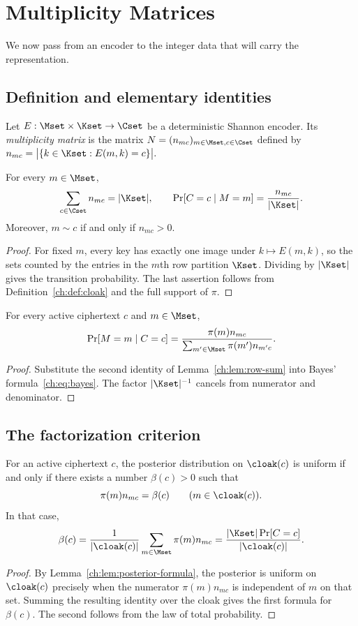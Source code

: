 ﻿\chapter[Multiplicity Matrices]{Multiplicity Matrices}\label{ch:sec:multiplicity}
We now pass from an encoder to the integer data that will carry the representation.
\section{Definition and elementary identities}
\begin{definition}\label{ch:def:multiplicity}
Let $E:\Mset\times\Kset\to\Cset$ be a deterministic Shannon encoder. Its \emph{multiplicity matrix} is the matrix $N=(n_{mc})_{m\in\Mset,c\in\Cset}$ defined by
$n_{mc}=\bigl|\{k\in\Kset:E(m,k)=c\}\bigr|.$
\end{definition}
\begin{lemma}\label{ch:lem:row-sum}
For every $m\in\Mset$,
\[
 \sum_{c\in\Cset}n_{mc}=|\Kset|,
 \qquad
 \Pr[C=c\mid M=m]=\frac{n_{mc}}{|\Kset|}.
\]
Moreover, $m\sim c$ if and only if $n_{mc}>0$.
\end{lemma}
\begin{proof}
For fixed $m$, every key has exactly one image under $k\mapsto E(m,k)$, so the sets counted by the entries in the $m$th row partition $\Kset$. Dividing by $|\Kset|$ gives the transition probability. The last assertion follows from Definition~\ref{ch:def:cloak} and the full support of $\pi$.
\end{proof}

\begin{lemma}\label{ch:lem:posterior-formula}
For every active ciphertext $c$ and $m\in\Mset$,
\[
 \Pr[M=m\mid C=c]
 =\frac{\pi(m)n_{mc}}{\sum_{m'\in\Mset}\pi(m')n_{m'c}}.
\]
\end{lemma}
\begin{proof}
Substitute the second identity of Lemma~\ref{ch:lem:row-sum} into Bayes' formula~\eqref{ch:eq:bayes}. The factor $|\Kset|^{-1}$ cancels from numerator and denominator.
\end{proof}
\section{The factorization criterion}
\begin{proposition}\label{ch:prop:factorization-criterion}
For an active ciphertext $c$, the posterior distribution on $\cloak(c)$ is uniform if and only if there exists a number $\beta(c)>0$ such that
\[
 \pi(m)n_{mc}=\beta(c)
 \qquad(m\in\cloak(c)).
\]
In that case,
\[
 \beta(c)=\frac{1}{|\cloak(c)|}\sum_{m\in\Mset}\pi(m)n_{mc}
 =\frac{|\Kset|\Pr[C=c]}{|\cloak(c)|}.
\]
\end{proposition}
\begin{proof}
By Lemma~\ref{ch:lem:posterior-formula}, the posterior is uniform on $\cloak(c)$ precisely when the numerator $\pi(m)n_{mc}$ is independent of $m$ on that set. Summing the resulting identity over the cloak gives the first formula for $\beta(c)$. The second follows from the law of total probability.
\end{proof}

